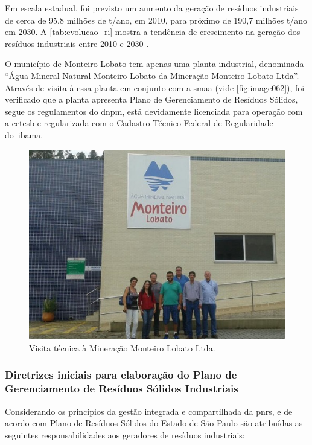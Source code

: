 	Em escala estadual, foi previsto um aumento da geração de resíduos industriais de cerca de 95,8 milhões de t/ano, em 2010, para próximo de 190,7 milhões t/ano em 2030. A \autoref{tab:evolucao_ri} mostra a tendência de crescimento na geração dos resíduos industriais entre 2010 e 2030 \cite{PERS2014}.
	
	
	
	O município de Monteiro Lobato tem apenas uma planta industrial, denominada “Água Mineral Natural Monteiro Lobato da Mineração Monteiro Lobato Ltda”. Através de visita à essa planta em conjunto com a \gls{smaa} (vide \autoref{fig:image062}), foi verificado que a planta apresenta Plano de Gerenciamento de Resíduos Sólidos, segue os regulamentos do \gls{dnpm}, está devidamente licenciada para operação com a \gls{cetesb} e regularizada com o Cadastro Técnico Federal de Regularidade do \gls{ibama}.
	
	\begin{figure}
		\centering
		\includegraphics[width=0.75\linewidth]{produtos/prodtres/image062}
		\caption{Visita técnica à Mineração Monteiro Lobato Ltda.}
		\label{fig:image062}
	\end{figure}
	
	
	\subsubsection{Diretrizes iniciais para elaboração do Plano de Gerenciamento de Resíduos Sólidos Industriais}
	
	Considerando os princípios da gestão integrada e compartilhada da \gls{pnrs}, e de acordo com Plano de Resíduos Sólidos do Estado de São Paulo são atribuídas as seguintes responsabilidades aos geradores de resíduos industriais:
	
